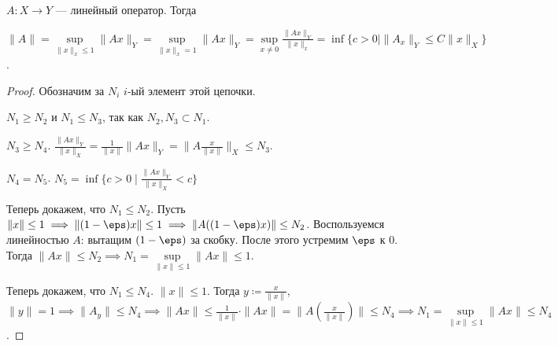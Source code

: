 \begin{theorem}
    $A\!: X \to Y$ --- линейный оператор. Тогда

     $\|A\| = \sup\limits_{\| x\|_x \le 1} \|Ax\|_Y = \sup\limits_{\| x\|_x = 1} \|Ax\|_Y = \sup\limits_{x \neq 0} \frac{\|Ax\|_Y}{\|x\|_x} = \inf\{ c > 0 \mid \|A_x\|_Y \le C \|x\|_X\}$.
\end{theorem}
\begin{proof}
    Обозначим за $N_i$  $i$-ый элемент этой цепочки. 

     $N_1 \ge N_2$ и $N_1 \le N_3$,  так как $N_2, N_3 \subset N_1$. 

     $N_3 \ge N_4$. $\frac{\|Ax\|_Y}{\|x\|_X} = \frac{1}{\|x\|}\|Ax\|_Y = \|A \frac{x}{\|x\|}\|_X \le N_3$.

     $N_4 = N_5$. $N_5 = \inf \{ c>0 \mid \frac{\|Ax\|_Y}{\|x\|_X} < c\}$

     Теперь докажем, что $N_1 \le N_2$. Пусть $\| x \| \le 1 \implies \| (1-\eps) x \| \le 1 \implies \| A((1-\eps)x) \| \le N_2$. Воспользуемся линейностью $A$: вытащим  $(1-\eps)$ за скобку. После этого устремим  $\eps$ к 0. Тогда  $\| Ax \| \le N_2 \implies N_1 = \sup\limits_{\| x \| \le 1} \| A x\| \le 1$.

     Теперь докажем, что $N_1 \le N_4$. $\| x \| \le 1$. Тогда $y \coloneqq \frac{x}{\| x \|}$, $\|y\| = 1 \implies \| A_y \| \le N_4 \implies \| Ax \| \le \frac{1}{\|x\|} \cdot \| Ax \| = \| A(\frac{x}{\| x \|}) \|  \le N_4 \implies N_1 = \sup\limits_{\|x \| \le 1} \|Ax\| \le N_4$.
\end{proof}
